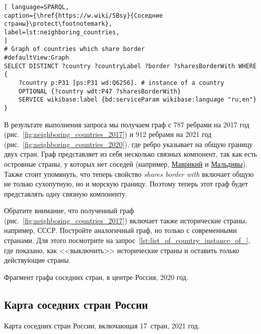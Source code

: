 \begin{lstlisting}[ language=SPARQL, 
caption={\href{https://w.wiki/5Bsy}{Соседние страны}\protect\footnotemark},
label=lst:neighboring_countries, 
]
# Graph of countries which share border
#defaultView:Graph
SELECT DISTINCT ?country ?countryLabel ?border ?sharesBorderWith WHERE
{
    ?country p:P31 [ps:P31 wd:Q6256]. # instance of a country
    OPTIONAL {?country wdt:P47 ?sharesBorderWith}
    SERVICE wikibase:label {bd:serviceParam wikibase:language "ru,en"}
}
\end{lstlisting}

В результате выполнения запроса мы получаем граф с 787 ребрами на 2017 год 
(рис.~\ref{fig:neighboring_countries_2017}) 
и 912 ребрами на 2021 год (рис.~\ref{fig:neighboring_countries_2020}), 
где ребро указывает на общую границу двух стран. 
Граф представляет из себя несколько связных компонент, 
так как есть островные страны, у которых нет соседей 
(например, \href{https://w.wiki/vC7}{Маврикий} и \href{https://w.wiki/vC8}{Мальдивы}). 
Также стоит упомянуть, что теперь свойство {\textit{shares border with}} 
включает общую не только сухопутную, но и морскую границу. 
Поэтому теперь этот граф будет представлять одну связную компоненту. 

Обратите внимание, что полученный граф (рис.~\ref{fig:neighboring_countries_2017}) 
включает также исторические страны, например, СССР. 
Постройте аналогичный граф, но только с современными странами. 
Для этого посмотрите на запрос~\ref{lst:list_of_country_instance_of_}, где показано, 
как <<выключить>> исторические страны и оставить только действующие страны. 

\begin{marginfigure}
	{
		\setlength{\fboxsep}{0pt}%
		\setlength{\fboxrule}{1pt}%
	}
    \caption[Фрагмент графа соседних стран, 2020 год.]{Фрагмент графа соседних стран, в центре Россия, 2020 год.}
	\label{fig:neighboring_countries_2020}%
\end{marginfigure}



\newpage
\subsection{Карта соседних стран России}
%
\begin{marginfigure}[2\baselineskip]
	{
		\setlength{\fboxsep}{0pt}%
		\setlength{\fboxrule}{1pt}%
	}
    \caption[Карта соседних стран России, 2021 год.]{Карта соседних стран России, включающая 17~стран, 2021 год.}
	\label{fig:neighboring_countries_ru_2020}%
\end{marginfigure}


